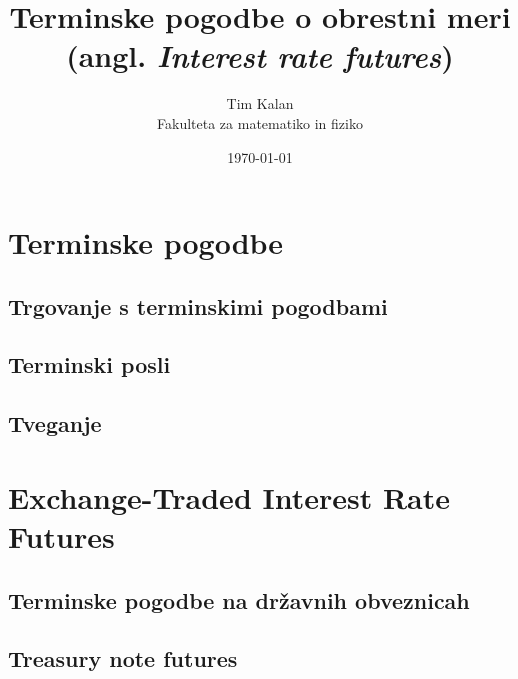 \documentclass[a4paper, 12pt]{article}
\author{Tim Kalan \\ Fakulteta za matematiko in fiziko}
\title{
    Terminske pogodbe o obrestni meri \\ 
    \large (angl. \textit{Interest rate futures})}
\date{\today}
\begin{document}
\maketitle
\tableofcontents

\section{Terminske pogodbe}
\subsection{Trgovanje s terminskimi pogodbami}
\subsection{Terminski posli}
\subsection{Tveganje}

\section{Exchange-Traded Interest Rate Futures}
\subsection{Terminske pogodbe na državnih obveznicah}
\subsection{Treasury note futures}
\end{document}
